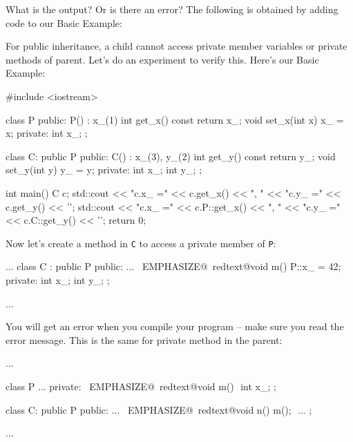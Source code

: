 \begin{ex} What is the output? Or is there an error? The
following is obtained by adding code to our Basic Example:
\end{ex}
\newpage{}

For public inheritance, a child cannot access private member variables
or private methods of parent. Let's do an experiment to verify this.
Here's our Basic Example:
\begin{console}
#include <iostream>

class P
{
public:
        P() : x_(1) {}
        int get_x() const { return x_; }
        void set_x(int x) { x_ = x; }
private:
        int x_;
};

class C: public P
{
public:
        C() : x_(3), y_(2) {}
        int get_y() const { return y_; }
        void set_y(int y) { y_ = y; }
private:
        int x_;
        int y_;
};

int main()
{   
    C c;
    std::cout << "c.x_ =" << c.get_x() << ", "
              << "c.y_ =" << c.get_y() << '\n';
    std::cout << "c.x_ =" << c.P::get_x() << ", "
              << "c.y_ =" << c.C::get_y() << '\n';
return 0;
}
\end{console}

Now let's create a method in \verb!C! to access a private member of
\verb!P!:
\begin{console}[commandchars=\~\@\$]
...
class C : public P
{
public:
        ...
        ~EMPHASIZE@~redtext@void m() { P::x_ = 42; }$$
private:
        int x_;
        int y_;
};

... 
\end{console}

You will get an error when you compile your program -- make sure you
read the error message. This is the same for private method in the
parent:
\begin{console}
...

class P
{     
...
private:
        ~EMPHASIZE@~redtext@void m() {}$$
        int x_;
};

class C: public P
{
public:
        ...
        ~EMPHASIZE@~redtext@void n() { m(); }$$
        ...
};

...
\end{console}

